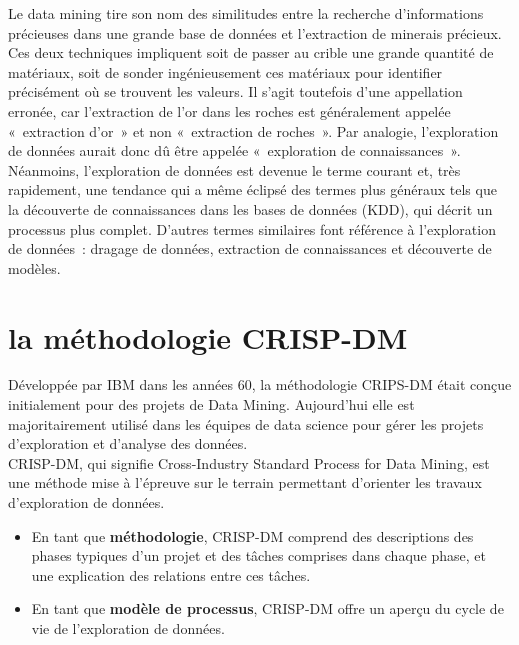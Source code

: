 \documentclass[a4paper,12pt]{report}
\begin{document}
        Le data mining tire son nom des similitudes entre la recherche d'informations précieuses dans une grande base de données et l'extraction de minerais précieux. Ces deux techniques impliquent soit de passer au crible une grande quantité de matériaux, soit de sonder ingénieusement ces matériaux pour identifier précisément où se trouvent les valeurs. Il s'agit toutefois d'une appellation erronée, car l'extraction de l'or dans les roches est généralement appelée « extraction d'or » et non « extraction de roches ». Par analogie, l'exploration de données aurait donc dû être appelée « exploration de connaissances ». Néanmoins, l'exploration de données est devenue le terme courant et, très rapidement, une tendance qui a même éclipsé des termes plus généraux tels que la découverte de connaissances dans les bases de données (KDD), qui décrit un processus plus complet. D'autres termes similaires font référence à l'exploration de données : dragage de données, extraction de connaissances et découverte de modèles.

    \section{la méthodologie CRISP-DM}
        Développée par IBM dans les années 60, la méthodologie CRIPS-DM était conçue initialement pour des projets de Data Mining. Aujourd'hui elle est majoritairement utilisé dans les équipes de data science pour gérer les projets d’exploration et d’analyse des données.\\
        CRISP-DM, qui signifie Cross-Industry Standard Process for Data Mining, est une méthode mise à l'épreuve sur le terrain permettant d'orienter les travaux d'exploration de données.
        \begin{itemize}
            \item En tant que \textbf{méthodologie}, CRISP-DM comprend des descriptions des phases typiques d'un projet et des tâches comprises dans chaque phase, et une explication des relations entre ces tâches.
            \item En tant que \textbf{modèle de processus}, CRISP-DM offre un aperçu du cycle de vie de l'exploration de données.
        \end{itemize}
    
\end{document}
